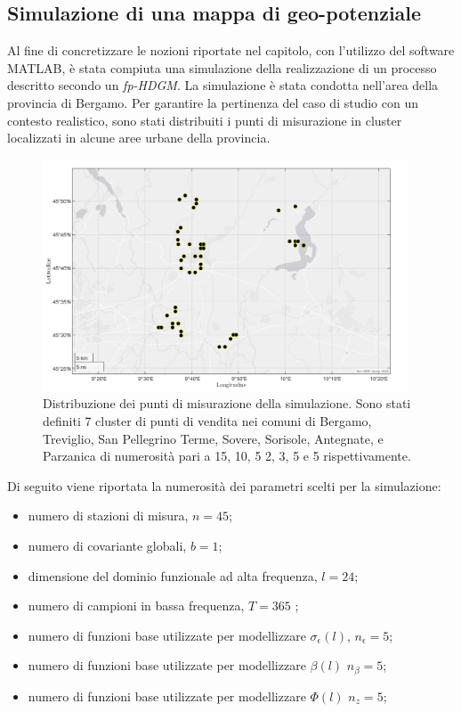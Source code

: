 \subsection[Simulazione di una mappa di geo-potenziale]{Simulazione di una mappa di geo-potenziale}
Al fine di concretizzare le nozioni riportate nel capitolo, con l'utilizzo del software MATLAB, è stata compiuta una simulazione della realizzazione di un processo descritto secondo un \textit{fp-HDGM}. La simulazione è stata condotta nell'area della provincia di Bergamo. Per garantire la pertinenza del caso di studio con un contesto realistico, sono stati distribuiti i punti di misurazione in cluster localizzati in alcune aree urbane della provincia. 
\begin{figure}[htp]
	\centering
	\includegraphics[height=260px]{Immagini/2. Nuovo modello/Mappa stazioni simulate_png}
	\caption[ Distribuzione dei punti di misurazione della simulazione.] {Distribuzione dei punti di misurazione della simulazione. Sono stati definiti 7 cluster di punti di vendita nei comuni di Bergamo, Treviglio, San Pellegrino Terme, Sovere, Sorisole, Antegnate, e Parzanica di numerosità pari a 15, 10, 5 2, 3, 5 e 5 rispettivamente.}
	\label{mappa_stazioni_simulate}
\end{figure}
Di seguito viene riportata la numerosità dei parametri scelti per la simulazione:
\begin{itemize}
	\item numero di stazioni di misura, $n=45$;
	\item numero di covariante globali, $b=1$;
	\item dimensione del dominio funzionale ad alta frequenza, $l=24$;
	\item numero di campioni in bassa frequenza, $T=365$ ;
	\item numero di funzioni base utilizzate per modellizzare  $\sigma_\epsilon (l)$,  $n_\epsilon =5$;
	\item numero di funzioni base utilizzate per modellizzare $\beta(l)$ $n_\beta=5$;
	\item numero di funzioni base utilizzate per modellizzare $\Phi(l)$ $n_z=5$;
\end{itemize}

